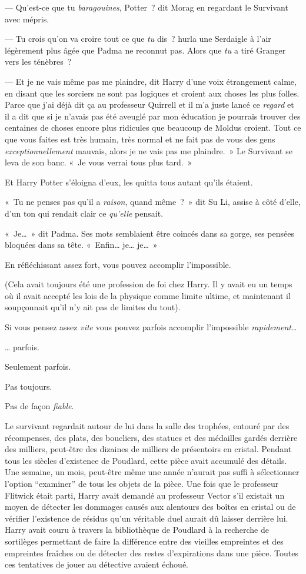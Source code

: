 --- Qu'est-ce que tu \emph{baragouines}, Potter~? dit Morag en regardant le Survivant avec mépris.

--- Tu crois qu'on va croire tout ce que \emph{tu} dis~? hurla une Serdaigle à l'air légèrement plus âgée que Padma ne reconnut pas.
Alors que \emph{tu} a tiré Granger vers les ténèbres~?

--- Et je ne vais même pas me plaindre, dit Harry d'une voix étrangement calme, en disant que les sorciers ne sont pas logiques et croient aux choses les plus folles.
Parce que j'ai déjà dit ça au professeur Quirrell et il m'a juste lancé ce \emph{regard} et il a dit que si je n'avais pas été aveuglé par mon éducation je pourrais trouver des centaines de choses encore plus ridicules que beaucoup de Moldus croient.
Tout ce que vous faites est très humain, très normal et ne fait pas de vous des gens \emph{exceptionnellement} mauvais, alors je ne vais pas me plaindre.~»
Le Survivant se leva de son banc.
«~Je vous verrai tous plus tard.~»

Et Harry Potter s'éloigna d'eux, les quitta tous autant qu'ils étaient.

«~Tu ne penses pas qu'il a \emph{raison}, quand même~?~»
dit Su Li, assise à côté d'elle, d'un ton qui rendait clair ce \emph{qu'elle} pensait.

«~Je…~» dit Padma.
Ses mots semblaient être coincés dans sa gorge, ses pensées bloquées dans sa tête.
«~Enfin… je… je…~»

\later

En réfléchissant assez fort, vous pouvez accomplir l'impossible.

(Cela avait toujours été une profession de foi chez Harry.
Il y avait eu un temps où il avait accepté les lois de la physique comme limite ultime, et maintenant il soupçonnait qu'il n'y ait pas de limites du tout).

Si vous pensez assez \emph{vite} vous pouvez parfois accomplir l'impossible \emph{rapidement}…

… parfois.

Seulement parfois.

Pas toujours.

Pas de façon \emph{fiable}.

Le survivant regardait autour de lui dans la salle des trophées, entouré par des récompenses, des plats, des boucliers, des statues et des médailles gardés derrière des milliers, peut-être des dizaines de milliers de présentoirs en cristal.
Pendant tous les siècles d'existence de Poudlard, cette pièce avait accumulé des détails.
Une semaine, un mois, peut-être même une année n'aurait pas suffi à sélectionner l'option “examiner” de tous les objets de la pièce.
Une fois que le professeur Flitwick était parti, Harry avait demandé au professeur Vector s'il existait un moyen de détecter les dommages causés aux alentours des boîtes en cristal ou de vérifier l'existence de résidus qu'un véritable duel aurait dû laisser derrière lui.
Harry avait couru à travers la bibliothèque de Poudlard à la recherche de sortilèges permettant de faire la différence entre des vieilles empreintes et des empreintes fraîches ou de détecter des restes d'expirations dans une pièce.
Toutes ces tentatives de jouer au détective avaient échoué.

